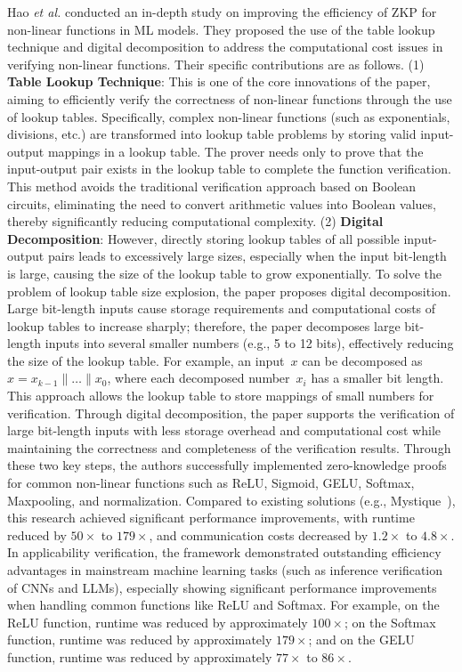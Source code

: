 \documentclass[journal]{IEEEtran}
\begin{document}
Hao \emph{et al.}  \cite{hao2024scalable} conducted an in-depth study on improving the efficiency of ZKP for non-linear functions in ML models. They proposed the use of the table lookup technique and digital decomposition to address the computational cost issues in verifying non-linear functions. Their specific contributions are as follows. (1) {\bf Table Lookup Technique}: This is one of the core innovations of the paper, aiming to efficiently verify the correctness of non-linear functions through the use of lookup tables. Specifically, complex non-linear functions (such as exponentials, divisions, etc.) are transformed into lookup table problems by storing valid input-output mappings in a lookup table. The prover needs only to prove that the input-output pair exists in the lookup table to complete the function verification. This method avoids the traditional verification approach based on Boolean circuits, eliminating the need to convert arithmetic values into Boolean values, thereby significantly reducing computational complexity. (2) {\bf Digital Decomposition}: However, directly storing lookup tables of all possible input-output pairs leads to excessively large sizes, especially when the input bit-length is large, causing the size of the lookup table to grow exponentially. To solve the problem of lookup table size explosion, the paper proposes digital decomposition. Large bit-length inputs cause storage requirements and computational costs of lookup tables to increase sharply; therefore, the paper decomposes large bit-length inputs into several smaller numbers (e.g., 5 to 12 bits), effectively reducing the size of the lookup table. For example, an input~$x$ can be decomposed as $x = x_{k-1} \parallel \ldots \parallel x_0$, where each decomposed number~$x_i$ has a smaller bit length. This approach allows the lookup table to store mappings of small numbers for verification. Through digital decomposition, the paper supports the verification of large bit-length inputs with less storage overhead and computational cost while maintaining the correctness and completeness of the verification results. Through these two key steps, the authors successfully implemented zero-knowledge proofs for common non-linear functions such as ReLU, Sigmoid, GELU, Softmax, Maxpooling, and normalization. Compared to existing solutions (e.g., Mystique~\cite{weng2021mystique}), this research achieved significant performance improvements, with runtime reduced by $50\times$ to $179\times$, and communication costs decreased by $1.2\times$ to $4.8\times$. In applicability verification, the framework demonstrated outstanding efficiency advantages in mainstream machine learning tasks (such as inference verification of CNNs and LLMs), especially showing significant performance improvements when handling common functions like ReLU and Softmax. For example, on the ReLU function, runtime was reduced by approximately $100\times$; on the Softmax function, runtime was reduced by approximately $179\times$; and on the GELU function, runtime was reduced by approximately $77\times$ to $86\times$.
\end{document}
